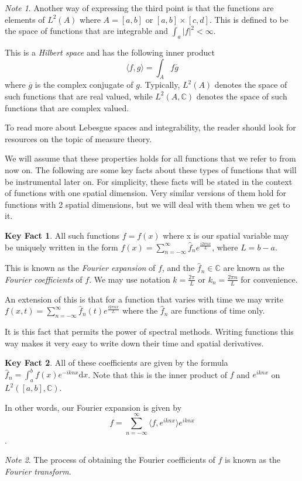 \documentclass[a4paper,11pt]{article}
\theoremstyle{plain} %
\theoremstyle{remark}
\newtheorem*{note}{Note}
\theoremstyle{definition} %
\newtheorem{fact}{Key Fact}[section]
\renewcommand{\d}{\text{d}}
\newcommand{\C}{\mathbb{C}}
\newcommand*\conj[1]{\overline{#1}}
\newcommand{\inner}[2]{\langle #1, #2\rangle }
\begin{document}
\begin{note}
Another way of expressing the third point is that the functions are elements of $L^2(A)$ where $A=[a,b]$ or $[a,b]\times[c,d]$. This is defined to be the space of functions that are integrable and $\int_a|f|^2<\infty$. 

This is a \emph{Hilbert space} and has the following inner product
\[
\inner{f}{g} = \int_A f \conj{g}
\]
where $\overline{g}$ is the complex conjugate of $g$. Typically, $L^2(A)$ denotes the space of such functions that are real valued, while $L^2(A,\C)$ denotes the space of such functions that are complex valued.

To read more about Lebesgue spaces and integrability, the reader should look for resources on the topic of measure theory.
\end{note}

We will assume that these properties holds for all functions that we refer to from now on. The following are some key facts about these types of functions that will be instrumental later on. For simplicity, these facts will be stated in the context of functions with one spatial dimension. Very similar versions of them hold for functions with 2 spatial dimensions, but we will deal with them when we get to it.

\begin{fact}
All such functions $f=f(x)$ where x is our spatial variable may be uniquely written in the form $f(x)=\sum_{n=-\infty}^\infty \widehat{f}_n e^{\frac{i2\pi n x}{L}}$, where $L=b-a$. 

This is known as the \emph{Fourier expansion} of $f$, and the  $\widehat{f}_n \in \C$ are known as the \emph{Fourier coefficients} of $f$. We may use notation $k=\frac{2\pi}{L}$ or $k_n=\frac{2\pi n}{L}$ for convenience.

An extension of this is that for a function that varies with time we may write $f(x,t)=\sum_{n=-\infty}^\infty \widehat{f}_n(t) e^{\frac{i2\pi n x}{L}}$ where the $\widehat{f}_n$ are functions of time only.
\end{fact}

It is this fact that permits the power of spectral methods. Writing functions this way makes it very easy to write down their time and spatial derivatives.

\begin{fact}
All of these coefficients are given by the formula $\widehat{f}_n = \int_a^b f(x)e^{-iknx}\d x$. Note that this is the inner product of $f$ and $e^{iknx}$ on $L^2([a,b], \C)$. 

In other words, our Fourier expansion is given by \[f=\sum_{n=-\infty}^\infty \inner{f}{e^{ikn x}} e^{ikn x}\].
\end{fact}
\begin{note}
The process of obtaining the Fourier coefficients of $f$ is known as the \emph{Fourier transform}.
\end{note}
\end{document}
